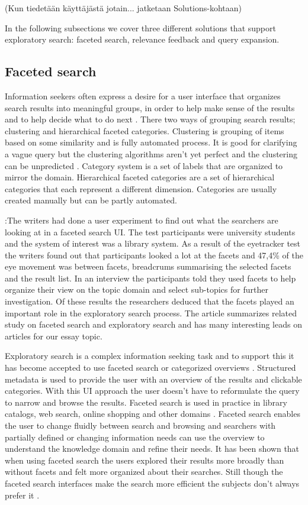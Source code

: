 \documentclass{sigchi}
\begin{document}
(Kun tiedetään käyttäjästä jotain... jatketaan Solutions-kohtaan)

In the following subsections we cover three different solutions that support exploratory search: faceted search, relevance feedback and query expansion.

\subsection{Faceted search}

Information seekers often express a desire for a user interface that organizes search results into meaningful groups, in order to help make sense of the results and to help decide what to do next \cite{hearst06}. There two ways of grouping search results; clustering and hierarchical faceted categories. Clustering is grouping of items based on some similarity and is fully automated process. It is good for clarifying a vague query but the clustering algorithms aren't yet perfect and the clustering can be unpredicted \cite{hearst06}. Category system is a set of labels that are organized to mirror the domain. Hierarchical faceted categories are a set of hierarchical categories that each represent a different dimension. Categories are usually created manually but can be partly automated. 

\cite{kules09}:The writers had done a user experiment to find out what  the searchers are  looking at in a faceted search UI. The test participants were  university students and the system of interest was a library system. As a result  of the eyetracker test the writers found out that participants looked a lot at the facets and  47,4\% of the  eye movement  was between facets, breadcrums summarising the selected facets and the result list. In an interview the participants told they used facets to help organize their view on the topic domain and select sub-topics for further investigation. Of these results the researchers deduced that the facets played an important role in the exploratory search process. 
The article summarizes related study on faceted search and exploratory search and has many interesting leads on articles for our essay topic.

Exploratory search is a complex information seeking task and to support this it has become accepted to use faceted search or categorized overviews \cite{kules09}. Structured metadata is used to provide the user with an overview of the results and clickable categories. With this UI approach the user doesn't have to reformulate the query to narrow and browse the results. Faceted search is used in practice in library catalogs, web search, online shopping and other domains \cite{kules09}. Faceted search enables the user to change fluidly between search and browsing and searchers with partially defined or changing information needs can use the overview to understand the knowledge domain and refine their needs. It has been shown that when using faceted search the users explored their results more broadly than without facets and felt more organized about their searches. Still though the faceted search interfaces make the search more efficient the subjects don't always prefer it \cite{kules09}. 
\end{document}
